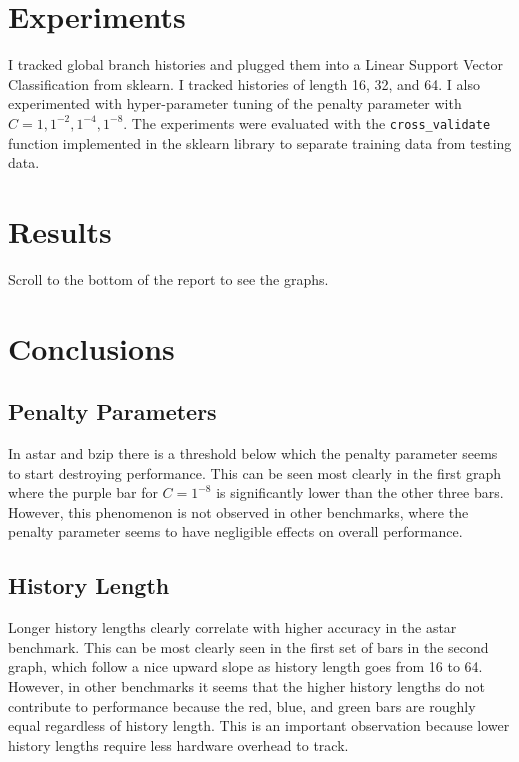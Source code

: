 \documentclass{article}
\begin{document}
\maketitle



\section{Experiments}

I tracked global branch histories and plugged them into a Linear Support Vector Classification from sklearn. I tracked histories of length 16, 32, and 64. I also experimented with hyper-parameter tuning of the penalty parameter with $C = 1, 1^{-2}, 1^{-4}, 1^{-8}$. The experiments were evaluated with the \texttt{cross\_validate} function implemented in the sklearn library to separate training data from testing data.   

\section{Results}

Scroll to the bottom of the report to see the graphs. 

\section{Conclusions}

\subsection{Penalty Parameters}

In astar and bzip there is a threshold below which the penalty parameter seems to start destroying performance. This can be seen most clearly in the first graph where the purple bar for $C = 1^{-8}$ is significantly lower than the other three bars. However, this phenomenon is not observed in other benchmarks, where the penalty parameter seems to have negligible effects on overall performance. 

\subsection{History Length}

Longer history lengths clearly correlate with higher accuracy in the astar benchmark. This can be most clearly seen in the first set of bars in the second graph, which follow a nice upward slope as history length goes from 16 to 64. However, in other benchmarks it seems that the higher history lengths do not contribute to performance because the red, blue, and green bars are roughly equal regardless of history length. This is an important observation because lower history lengths require less hardware overhead to track. 
\end{document}
